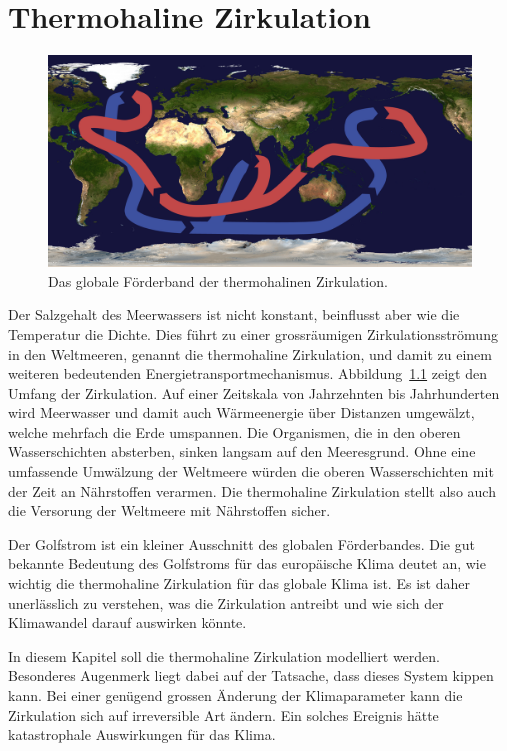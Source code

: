 %
%
%
\chapter{Thermohaline Zirkulation\label{chapter:thc}}
\begin{figure}
\centering
\includegraphics[width=\hsize]{chapters/4/1280px-Thermohaline_circulation.png}
\caption{
Das globale Förderband der thermohalinen Zirkulation.
\label{skript:thc:foerderband}}
\end{figure}%
Der Salzgehalt des Meerwassers ist nicht konstant, beinflusst aber
wie die Temperatur die Dichte.
Dies führt zu einer grossräumigen Zirkulationsströmung in den Weltmeeren,
genannt die thermohaline Zirkulation,
und damit zu einem weiteren bedeutenden Energietransportmechanismus.
Abbildung~\ref{skript:thc:foerderband} zeigt den Umfang der Zirkulation.
Auf einer Zeitskala von Jahrzehnten bis Jahrhunderten wird Meerwasser 
und damit auch Wärmeenergie über Distanzen umgewälzt, welche mehrfach die
Erde umspannen.
Die Organismen, die in den oberen Wasserschichten absterben, sinken langsam
auf den Meeresgrund.
Ohne eine umfassende Umwälzung der Weltmeere würden die oberen Wasserschichten
mit der Zeit an Nährstoffen verarmen.
Die thermohaline Zirkulation stellt also auch die Versorung der
Weltmeere mit Nährstoffen sicher.

Der Golfstrom ist ein kleiner Ausschnitt des globalen Förderbandes.
Die gut bekannte Bedeutung des Golfstroms für das europäische Klima 
deutet an, wie wichtig die thermohaline Zirkulation für das globale
Klima ist.
Es ist daher unerlässlich zu verstehen, was die Zirkulation antreibt und
wie sich der Klimawandel darauf auswirken könnte.

In diesem Kapitel soll die thermohaline Zirkulation modelliert werden.
Besonderes Augenmerk liegt dabei auf der Tatsache, dass dieses System
kippen kann.
Bei einer genügend grossen Änderung der Klimaparameter kann die Zirkulation
sich auf irreversible Art ändern.
Ein solches Ereignis hätte katastrophale Auswirkungen für das Klima.







